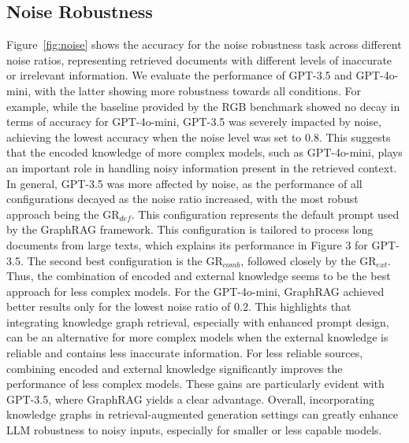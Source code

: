 \documentclass[letterpaper, 10 pt, conference]{ieeeconf}  %
\begin{document}
\subsection{Noise Robustness}


Figure~\ref{fig:noise} shows the accuracy for the noise robustness task across different noise ratios, representing retrieved documents with different levels of inaccurate or irrelevant information. We evaluate the performance of GPT-3.5 and GPT-4o-mini, with the latter showing more robustness towards all conditions. For example, while the baseline provided by the RGB benchmark showed no decay in terms of accuracy for GPT-4o-mini, GPT-3.5 was severely impacted by noise, achieving the lowest accuracy when the noise level was set to 0.8. This suggests that the encoded knowledge of more complex models, such as GPT-4o-mini, plays an important role in handling noisy information present in the retrieved context. In general, GPT-3.5 was more affected by noise, as the performance of all configurations decayed as the noise ratio increased, with the most robust approach being the GR$_{def}$. This configuration represents the default prompt used by the GraphRAG framework. This configuration is tailored to process long documents from large texts, which explains its performance in Figure 3 for GPT-3.5. The second best configuration is the GR$_{comb}$, followed closely by the GR$_{ext}$. Thus, the combination of encoded and external knowledge seems to be the best approach for less complex models. For the GPT-4o-mini, GraphRAG achieved better results only for the lowest noise ratio of 0.2. This highlights that integrating knowledge graph retrieval, especially with enhanced prompt design, can be an alternative for more complex models when the external knowledge is reliable and contains less inaccurate information. For less reliable sources, combining encoded and external knowledge significantly improves the performance of less complex models. These gains are particularly evident with GPT-3.5, where GraphRAG yields a clear advantage. Overall, incorporating knowledge graphs in retrieval-augmented generation settings can greatly enhance LLM robustness to noisy inputs, especially for smaller or less capable models.
\end{document}
